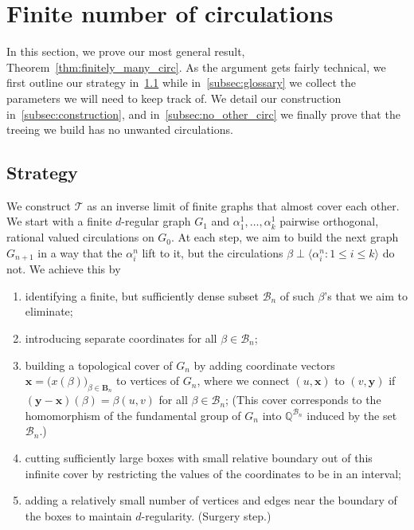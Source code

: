 \documentclass[10pt]{article}
\theoremstyle{plain}
\theoremstyle{remark}
\newcommand{\1}{\mathbbm{1}}
\newcommand{\mcT}{\mathcal{T}}
\numberwithin{equation}{section}
\begin{document}
\section{Finite number of circulations} \label{sec:finitely_many_circ}

In this section, we prove our most general result, Theorem~\ref{thm:finitely_many_circ}. As the argument gets fairly technical, we first outline our strategy in~\ref{subsec:strategy} while in~\ref{subsec:glossary} we collect the parameters we will need to keep track of. We detail our construction  in~\ref{subsec:construction}, and in~\ref{subsec:no_other_circ} we finally prove that the treeing we build has no unwanted circulations. 

\subsection{Strategy} \label{subsec:strategy}

We construct $\mcT$ as an inverse limit of finite graphs that almost cover each other. We start with a finite $d$-regular graph $G_1$ and $\alpha^1_1, \ldots, \alpha^1_k$ pairwise orthogonal, rational valued circulations on $G_0$. At each step, we
aim to build the next graph $G_{n+1}$ in a way that the $\alpha^n_i$ lift to it, but the circulations $\beta \perp \langle \alpha^n_i:1\leq i \leq k \rangle $ do not. We achieve this by 
\begin{enumerate}
    \item identifying a finite, but sufficiently dense subset $\mathcal{B}_n$ of such $\beta$'s that we aim to eliminate;
    \item introducing separate coordinates for all $\beta \in \mathcal{B}_n$;
    \item building a topological cover of $G_n$ by adding coordinate vectors $\mathbf{x}=\big(x(\beta)\big)_{\beta \in \mathbf{B}_n}$ to vertices of $G_n$, where we connect  $(u,\mathbf{x})$ to $(v,\mathbf{y})$ if $(\mathbf{y}-\mathbf{x})(\beta) = \beta(u,v)$ for all $\beta \in \mathcal{B}_n$; (This  cover corresponds to the homomorphism of the fundamental group of $G_n$ into $\mathbb{Q}^{\mathcal{B}_n}$ induced by the set $\mathcal{B}_n$.)
    \item cutting sufficiently large boxes with small relative boundary out of this infinite cover by restricting the values of the coordinates to be in an interval;
    \item \label{step:surgery} adding a relatively small number of vertices and edges near the boundary of the boxes to maintain $d$-regularity. (Surgery step.)
\end{enumerate} 
\end{document}
